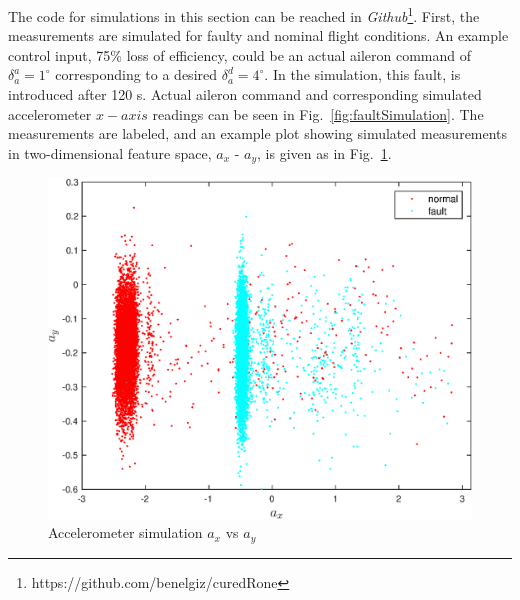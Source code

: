 The code for simulations in this section can be reached in \emph{Github}\footnote{https://github.com/benelgiz/curedRone}. 
First, the measurements are simulated for faulty and nominal flight conditions. 
An example control input, 75\% loss of efficiency, could be an actual aileron command of $\delta_{a}^a=1^\circ$ corresponding to a desired $\delta_{a}^d=4^\circ$. In the simulation, this fault, is introduced after 120 s. Actual aileron command and corresponding simulated accelerometer $x-axis$ readings can be seen in Fig.~\ref{fig:faultSimulation}. 
The measurements are labeled, and an example plot showing simulated measurements in two-dimensional feature space, $a_x$ - $a_y$, is given as in Fig.~\ref{fig:feat1vsfeat2}. 

\begin{figure}
\begin{center}
\includegraphics[width=12cm]{figures/feat1vsfeat2}    %
\caption{Accelerometer simulation $a_x$ vs $a_y$ } 
\label{fig:feat1vsfeat2}
\end{center}
\end{figure}


